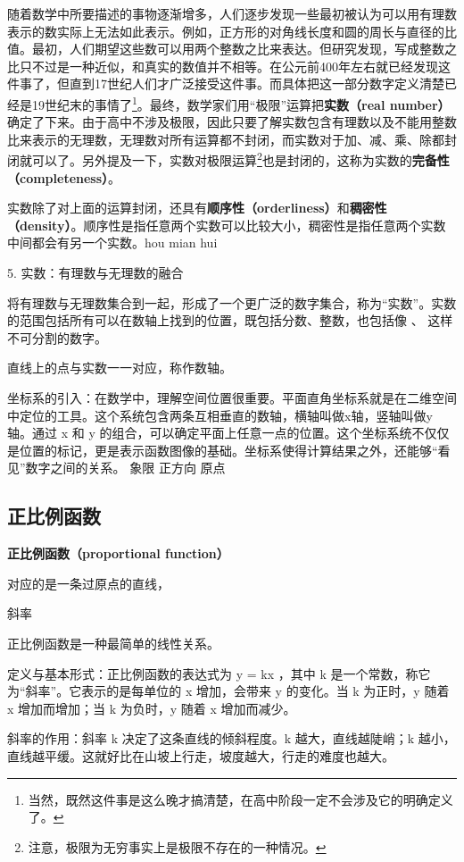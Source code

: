 随着数学中所要描述的事物逐渐增多，人们逐步发现一些最初被认为可以用有理数表示的数实际上无法如此表示。例如，正方形的对角线长度和圆的周长与直径的比值。最初，人们期望这些数可以用两个整数之比来表达。但研究发现，写成整数之比只不过是一种近似，和真实的数值并不相等。在公元前400年左右就已经发现这件事了，但直到17世纪人们才广泛接受这件事。而具体把这一部分数字定义清楚已经是19世纪末的事情了\footnote{当然，既然这件事是这么晚才搞清楚，在高中阶段一定不会涉及它的明确定义了。}。最终，数学家们用“极限”运算把\textbf{实数（real number）}确定了下来。由于高中不涉及极限，因此只要了解实数包含有理数以及不能用整数比来表示的无理数，无理数对所有运算都不封闭，而实数对于加、减、乘、除都封闭就可以了。另外提及一下，实数对极限运算\footnote{注意，极限为无穷事实上是极限不存在的一种情况。}也是封闭的，这称为实数的\textbf{完备性（completeness）}。

实数除了对上面的运算封闭，还具有\textbf{顺序性（orderliness）}和\textbf{稠密性（density）}。顺序性是指任意两个实数可以比较大小，稠密性是指任意两个实数中间都会有另一个实数。hou mian hui


5. 实数：有理数与无理数的融合

将有理数与无理数集合到一起，形成了一个更广泛的数字集合，称为“实数”。实数的范围包括所有可以在数轴上找到的位置，既包括分数、整数，也包括像  、 \pi 这样不可分割的数字。



直线上的点与实数一一对应，称作数轴。

坐标系的引入：在数学中，理解空间位置很重要。平面直角坐标系就是在二维空间中定位的工具。这个系统包含两条互相垂直的数轴，横轴叫做x轴，竖轴叫做y轴。通过 x 和 y 的组合，可以确定平面上任意一点的位置。这个坐标系统不仅仅是位置的标记，更是表示函数图像的基础。坐标系使得计算结果之外，还能够“看见”数字之间的关系。
象限
正方向
原点

\subsection{正比例函数}

\textbf{正比例函数（proportional function）}

对应的是一条过原点的直线，

斜率

正比例函数是一种最简单的线性关系。

定义与基本形式：正比例函数的表达式为  y = kx ，其中 k 是一个常数，称它为“斜率”。它表示的是每单位的 x 增加，会带来 y 的变化。当 k 为正时，y 随着 x 增加而增加；当 k 为负时，y 随着 x 增加而减少。

斜率的作用：斜率 k 决定了这条直线的倾斜程度。k 越大，直线越陡峭；k 越小，直线越平缓。这就好比在山坡上行走，坡度越大，行走的难度也越大。


